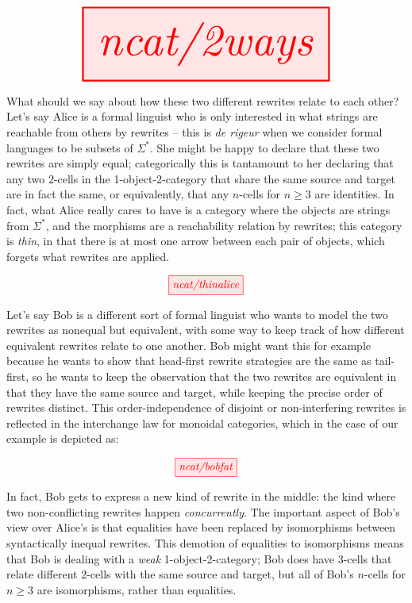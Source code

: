 \[\resizebox{0.8\textwidth}{!}{\tikzfig{ncat/2ways}}\]

What should we say about how these two different rewrites relate to each other? Let's say Alice is a formal linguist who is only interested in what strings are reachable from others by rewrites -- this is \emph{de rigeur} when we consider formal languages to be subsets of $\Sigma^*$. She might be happy to declare that these two rewrites are simply equal; categorically this is tantamount to her declaring that any two 2-cells in the 1-object-2-category that share the same source and target are in fact the same, or equivalently, that any $n$-cells for $n \geq 3$ are identities. In fact, what Alice really cares to have is a category where the objects are strings from $\Sigma^*$, and the morphisms are a reachability relation by rewrites; this category is \emph{thin}, in that there is at most one arrow between each pair of objects, which forgets what rewrites are applied.

\[\tikzfig{ncat/thinalice}\]

Let's say Bob is a different sort of formal linguist who wants to model the two rewrites as nonequal but equivalent, with some way to keep track of how different equivalent rewrites relate to one another. Bob might want this for example because he wants to show that head-first rewrite strategies are the same as tail-first, so he wants to keep the observation that the two rewrites are equivalent in that they have the same source and target, while keeping the precise order of rewrites distinct. This order-independence of disjoint or non-interfering rewrites is reflected in the interchange law for monoidal categories, which in the case of our example is depicted as:

\[\tikzfig{ncat/bobfat}\]

In fact, Bob gets to express a new kind of rewrite in the middle: the kind where two non-conflicting rewrites happen \emph{concurrently}. The important aspect of Bob's view over Alice's is that equalities have been replaced by isomorphisms between syntactically inequal rewrites. This demotion of equalities to isomorphisms means that Bob is dealing with a \emph{weak} 1-object-2-category; Bob does have 3-cells that relate different 2-cells with the same source and target, but all of Bob's $n$-cells for $n \geq 3$ are isomorphisms, rather than equalities.

